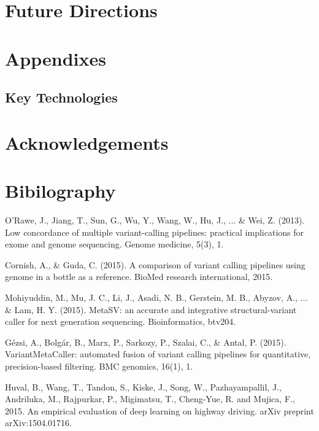 \documentclass{article}
\begin{document}
\section{Future Directions}


\section{Appendixes}
\subsection{Key Technologies}


\section{Acknowledgements}

\section{Bibilography}

\begin{thebibliography}{9}
O'Rawe, J., Jiang, T., Sun, G., Wu, Y., Wang, W., Hu, J., ... \& Wei, Z. (2013). Low concordance of multiple variant-calling pipelines: practical implications for exome and genome sequencing. Genome medicine, 5(3), 1.
 
 Cornish, A., \& Guda, C. (2015). A comparison of variant calling pipelines using genome in a bottle as a reference. BioMed research international, 2015.

Mohiyuddin, M., Mu, J. C., Li, J., Asadi, N. B., Gerstein, M. B., Abyzov, A., ... \& Lam, H. Y. (2015). MetaSV: an accurate and integrative structural-variant caller for next generation sequencing. Bioinformatics, btv204.

Gézsi, A., Bolgár, B., Marx, P., Sarkozy, P., Szalai, C., \& Antal, P. (2015). VariantMetaCaller: automated fusion of variant calling pipelines for quantitative, precision-based filtering. BMC genomics, 16(1), 1.

Huval, B., Wang, T., Tandon, S., Kiske, J., Song, W., Pazhayampallil, J., Andriluka, M., Rajpurkar, P., Migimatsu, T., Cheng-Yue, R. and Mujica, F., 2015. An empirical evaluation of deep learning on highway driving. arXiv preprint arXiv:1504.01716.

\end{thebibliography}
\end{document}
